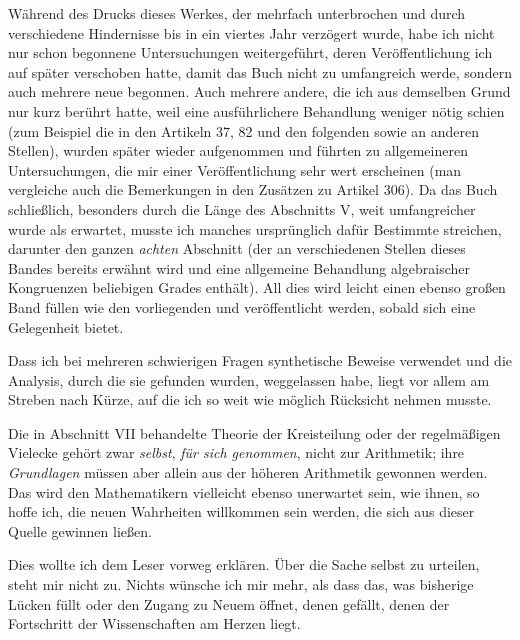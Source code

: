 Während des Drucks dieses Werkes, der mehrfach unterbrochen und durch verschiedene Hindernisse bis in ein viertes Jahr verzögert wurde, habe ich nicht nur schon begonnene Untersuchungen weitergeführt, deren Veröffentlichung ich auf später verschoben hatte, damit das Buch nicht zu umfangreich werde, sondern auch mehrere neue begonnen. Auch mehrere andere, die ich aus demselben Grund nur kurz berührt hatte, weil eine ausführlichere Behandlung weniger nötig schien (zum Beispiel die in den Artikeln 37, 82 und den folgenden sowie an anderen Stellen), wurden später wieder aufgenommen und führten zu allgemeineren Untersuchungen, die mir einer Veröffentlichung sehr wert erscheinen (man vergleiche auch die Bemerkungen in den Zusätzen zu Artikel 306). Da das Buch schließlich, besonders durch die Länge des Abschnitts V, weit umfangreicher wurde als erwartet, musste ich manches ursprünglich dafür Bestimmte streichen, darunter den ganzen \emph{achten} Abschnitt (der an verschiedenen Stellen dieses Bandes bereits erwähnt wird und eine allgemeine Behandlung algebraischer Kongruenzen beliebigen Grades enthält). All dies wird leicht einen ebenso großen Band füllen wie den vorliegenden und veröffentlicht werden, sobald sich eine Gelegenheit bietet.

Dass ich bei mehreren schwierigen Fragen synthetische Beweise verwendet und die Analysis, durch die sie gefunden wurden, weggelassen habe, liegt vor allem am Streben nach Kürze, auf die ich so weit wie möglich Rücksicht nehmen musste.

Die in Abschnitt VII behandelte Theorie der Kreisteilung oder der regelmäßigen Vielecke gehört zwar \emph{selbst}, \emph{für sich genommen}, nicht zur Arithmetik; ihre \emph{Grundlagen} müssen aber allein aus der höheren Arithmetik gewonnen werden. Das wird den Mathematikern vielleicht ebenso unerwartet sein, wie ihnen, so hoffe ich, die neuen Wahrheiten willkommen sein werden, die sich aus dieser Quelle gewinnen ließen.

Dies wollte ich dem Leser vorweg erklären. Über die Sache selbst zu urteilen, steht mir nicht zu. Nichts wünsche ich mir mehr, als dass das, was bisherige Lücken füllt oder den Zugang zu Neuem öffnet, denen gefällt, denen der Fortschritt der Wissenschaften am Herzen liegt.

